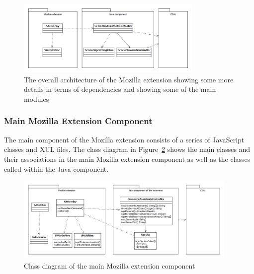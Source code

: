 \begin{figure}[htb]
  \centering
  \includegraphics[width=0.8\textwidth]{pictures/mozilla_development_notes_overall_architecture_more_detailed.png}
  \caption{The overall architecture of the Mozilla extension showing some more details in terms of dependencies and showing some of the main modules}
  \label{fig:mozilla_development_notes_overall_architecture_more_detailed}
\end{figure}

\subsubsection{Main Mozilla Extension Component}
The main component of the Mozilla extension consists of a series of JavaScript classes and XUL files. The class diagram in Figure~\ref{fig:mozilla_development_notes_mozilla_extension_class_diagram} shows the main classes and their associations in the main Mozilla extension component as well as the classes called within the Java component. 

\begin{figure}[htb]
  \centering
  \includegraphics[width=0.95\textwidth]{pictures/mozilla_development_notes_mozilla_extension_class_diagram.png}
  \caption{Class diagram of the main Mozilla extension component}
  \label{fig:mozilla_development_notes_mozilla_extension_class_diagram}
\end{figure}

